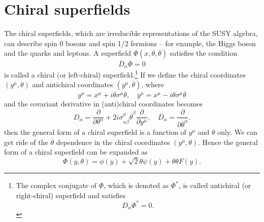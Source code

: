 \documentclass[12pt]{report}
\begin{document}
\section{Chiral superfields}
The chiral superfields, which are irreducible representations of the SUSY algebra, can describe spin 0 bosons and spin 1/2 fermions -- for example, the Higgs boson and the quarks and leptons.
A superfield $\Phi (x, \theta, \overline{\theta})$ satisfies the condition
\begin{equation} \label{eq: definition of chiral superfield}
\overline{D}_{\dot{\alpha}} \Phi =0
\end{equation}
 is called a chiral (or left-chiral) superfield.\footnote{The complex conjugate of $\Phi$, which is denoted as $\Phi^{*}$, is called antichiral (or right-chiral) superfield and satisfies
\begin{equation} \label{eq: definition of antichiral superfield}
D_{\alpha} \Phi^{*} = 0.
\end{equation}
}
If we define the chiral coordinates $(y^{\mu}, \theta)$ and antichiral coordinates $(\overline{y}^{\mu}, \overline{\theta})$, where
\begin{equation}
y^{\mu} = x^{\mu} + i \theta \sigma^{\mu} \overline{\theta}, \quad 
\overline{y}^{\mu} = x^{\mu} - i \theta \sigma^{\mu} \overline{\theta}
\end{equation}
and the covariant derivative in (anti)chiral coordinates becomes
\begin{equation}
D_{\alpha} = \frac{\partial}{\partial \theta^{\alpha}} + 2 i \sigma^{\mu}_{\alpha \dot{\beta}} \overline{\theta}^{\dot{\beta}} \frac{\partial}{\partial y^{\mu}}, \quad 
\overline{D}_{\dot{\alpha}} = \frac{\partial}{\partial \overline{\theta}^{\dot{\alpha}}} .
\end{equation}
then the general form of a chiral superfield is a function of $y^{\mu}$ and $\theta$ only.
We can get ride of the $\overline{\theta}$ dependence in the chiral coordinates $(y^{\mu}, \theta)$.
Hence the general form of a chiral superfield can be expanded as
\begin{equation}
\Phi (y, \theta) = \phi (y) + \sqrt{2} \theta \psi (y) + \theta \theta F(y) .
\end{equation}
\end{document}
